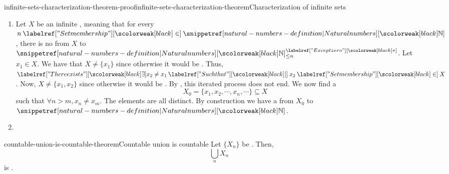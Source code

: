 \documentclass[preview]{standalone}
\begin{document}
\begin{snippetproof}{infinite-sets-characterization-theorem-proof}{infinite-sets-characterization-theorem}{Characterization of infinite sets}
    \begin{enumerate}
        \item Let \(X\) be an infinite \set, meaning that for every \(n\in\naturalnumbers\),
        there is no \bijective \function from \(X\) to \(\naturalnumbers^\exceptzero_{\leq n}\).
        Let \(x_1 \in X\). We have that \(X \neq \{x_1\}\) since otherwise it would be \setfinite.
        Thus, \(\exists x_2 \neq x_1 \suchthat x_2 \in X\).
        Now, \(X \neq \{x_1, x_2\}\) since otherwise it would be \setfinite.
        By \principleofinduction[induction], this iterated process does not end.
        We now find a \sequence
        \[
            X_0 = \{x_1, x_2, \cdots, x_n, \cdots\} \subseteq X
        \]
        such that \(\forall n > m, x_n \neq x_m\). The elements are all distinct.
        By construction we have a \bijective \function from \(X_0\) to \(\naturalnumbers\).
        \item {}
    \end{enumerate}
\end{snippetproof}

\begin{snippettheorem}{countable-union-is-countable-theorem}{Countable union is countable}
    Let \(\{X_n\}\) be \countable \set[sets]. Then,
    \[
        \bigcup_{n} X_n
    \]
    is \countable.
\end{snippettheorem}
\end{document}
